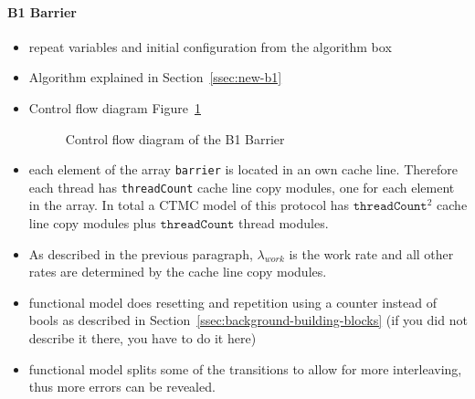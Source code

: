 \documentclass[a4paper, 10pt]{article}
\begin{document}
\paragraph{B1 Barrier}
\label{ssssec:analysis-modelchecking-modelling-b1}
\begin{itemize}
	\item repeat variables and initial configuration from the algorithm box
	\item Algorithm explained in Section~\ref{ssec:new-b1}
	\item Control flow diagram Figure~\ref{fig:model-b1}
		\begin{figure}[htbp]
			\centering
			
			\caption{Control flow diagram of the B1 Barrier}
			\label{fig:model-b1}
		\end{figure}
	\item each element of the array \texttt{barrier} is located in an own cache line. Therefore each thread has \texttt{threadCount} cache line copy modules, one for each element in the array. In total a CTMC model of this protocol has $\mathtt{threadCount}^2$ cache line copy modules plus $\mathtt{threadCount}$ thread modules.
	\item As described in the previous paragraph, $\lambda_{work}$ is the work rate and all other rates are determined by the cache line copy modules.
	\item functional model does resetting and repetition using a counter instead of bools as described in Section~\ref{ssec:background-building-blocks} (if you did not describe it there, you have to do it here)
	\item functional model splits some of the transitions to allow for more interleaving, thus more errors can be revealed.
\end{itemize}

\end{document}
